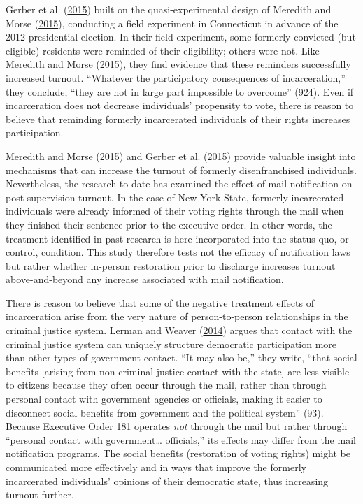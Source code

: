 \documentclass[
  12pt,
]{article}
\begin{document}
Gerber et al. (\protect\hyperlink{ref-Gerber2015}{2015}) built on the quasi-experimental design of Meredith and Morse (\protect\hyperlink{ref-Meredith2015}{2015}), conducting a field experiment in Connecticut in advance of the 2012 presidential election. In their field experiment, some formerly convicted (but eligible) residents were reminded of their eligibility; others were not. Like Meredith and Morse (\protect\hyperlink{ref-Meredith2015}{2015}), they find evidence that these reminders successfully increased turnout. ``Whatever the participatory consequences of incarceration,'' they conclude, ``they are not in large part impossible to overcome'' (924). Even if incarceration does not decrease individuals' propensity to vote, there is reason to believe that reminding formerly incarcerated individuals of their rights increases participation.

Meredith and Morse (\protect\hyperlink{ref-Meredith2015}{2015}) and Gerber et al. (\protect\hyperlink{ref-Gerber2015}{2015}) provide valuable insight into mechanisms that can increase the turnout of formerly disenfranchised individuals. Nevertheless, the research to date has examined the effect of mail notification on post-supervision turnout. In the case of New York State, formerly incarcerated individuals were already informed of their voting rights through the mail when they finished their sentence prior to the executive order. In other words, the treatment identified in past research is here incorporated into the status quo, or control, condition. This study therefore tests not the efficacy of notification laws but rather whether in-person restoration prior to discharge increases turnout above-and-beyond any increase associated with mail notification.

There is reason to believe that some of the negative treatment effects of incarceration arise from the very nature of person-to-person relationships in the criminal justice system. Lerman and Weaver (\protect\hyperlink{ref-Lerman2014}{2014}) argues that contact with the criminal justice system can uniquely structure democratic participation more than other types of government contact. ``It may also be,'' they write, ``that social benefits {[}arising from non-criminal justice contact with the state{]} are less visible to citizens because they often occur through the mail, rather than through personal contact with government agencies or officials, making it easier to disconnect social benefits from government and the political system'' (93). Because Executive Order 181 operates \emph{not} through the mail but rather through ``personal contact with government\ldots{} officials,'' its effects may differ from the mail notification programs. The social benefits (restoration of voting rights) might be communicated more effectively and in ways that improve the formerly incarcerated individuals' opinions of their democratic state, thus increasing turnout further.
\end{document}
